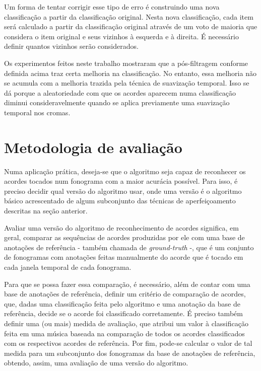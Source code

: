         Um forma de tentar corrigir esse tipo de erro é construindo uma nova classificação a partir da classificação original. Nesta nova classificação, cada item será calculado a partir da classificação original através de um voto de maioria que considera o item original e seus vizinhos à esquerda e à direita. É necessário definir quantos vizinhos serão considerados.
        
        Os experimentos feitos neste trabalho mostraram que a pós-filtragem conforme definida acima traz certa melhoria na classificação. No entanto, essa melhoria não se acumula com a melhoria trazida pela técnica de suavização temporal. Isso se dá porque a aleatoriedade com que os acordes aparecem numa classificação diminui consideravelmente quando se aplica previamente uma suavização temporal nos cromas.


\section{Metodologia de avaliação}
    Numa aplicação prática, deseja-se que o algoritmo seja capaz de reconhecer os acordes tocados num fonograma com a maior acurácia possível. Para isso, é preciso decidir qual versão do algoritmo usar, onde uma versão é o algoritmo básico acrescentado de algum subconjunto das técnicas de aperfeiçoamento descritas na seção anterior.
    
    Avaliar uma versão do algoritmo de reconhecimento de acordes significa, em geral, comparar as sequências de acordes produzidas por ele com uma base de anotações de referência - também chamada de \textit{ground-truth} -, que é um conjunto de fonogramas com anotações feitas manualmente do acorde que é tocado em cada janela temporal de cada fonograma.
    
    Para que se possa fazer essa comparação, é necessário, além de contar com uma base de anotações de referência, definir um critério de comparação de acordes, que, dadas uma classificação feita pelo algoritmo e uma anotação da base de referência, decide se o acorde foi classificado corretamente. É preciso também definir uma (ou mais) medida de avaliação, que atribui um valor à classificação feita em uma música baseada na comparação de todos os acordes classificados com os respectivos acordes de referência. Por fim, pode-se calcular o valor de tal medida para um subconjunto dos fonogramas da base de anotações de referência, obtendo, assim, uma avaliação de uma versão do algoritmo.

